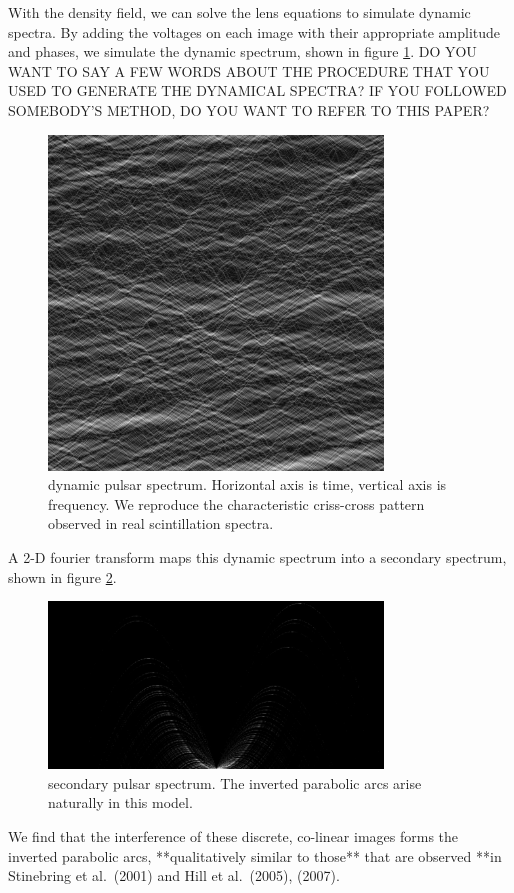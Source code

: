 \documentclass[useAMS,usenatbib]{mn2e}
\begin{document}
With the density field, we can solve the lens equations to simulate
dynamic spectra.  By adding the voltages on each image  with their
appropriate amplitude and phases, we simulate the dynamic spectrum,
shown in figure \ref{fig:ds}.
DO YOU WANT TO SAY A FEW WORDS ABOUT THE PROCEDURE THAT YOU USED
TO GENERATE THE DYNAMICAL SPECTRA? IF YOU FOLLOWED SOMEBODY'S
METHOD, DO YOU WANT TO REFER TO THIS PAPER?
\begin{figure}
\centerline{\includegraphics[width=3.5in]{rspect.jpg}}
\caption{dynamic pulsar spectrum.  Horizontal axis is time, vertical
  axis is frequency.  We reproduce the characteristic criss-cross
  pattern observed in real scintillation spectra.}
\label{fig:ds}
\end{figure}

A 2-D fourier transform maps this dynamic spectrum into a secondary
spectrum, shown in figure \ref{fig:ss}.

\begin{figure}
\centerline{\includegraphics[width=3.5in]{sspect.jpg}}
\caption{secondary pulsar spectrum.  The inverted parabolic arcs arise
naturally in this model.}
\label{fig:ss}
\end{figure}

We find that the interference of these discrete, co-linear images
forms the inverted parabolic arcs, **qualitatively similar to those** that are observed **in
Stinebring et al.~(2001) and Hill et al.~(2005), (2007).
\end{document}
